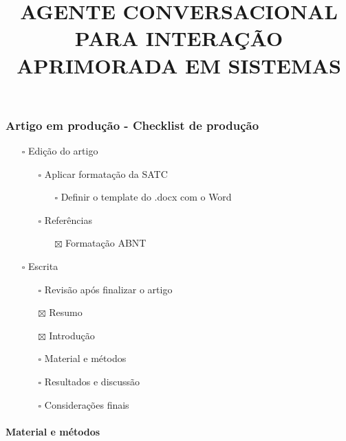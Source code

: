 \documentclass[
]{article}
\title{\textbf{AGENTE CONVERSACIONAL PARA INTERAÇÃO APRIMORADA EM
SISTEMAS}}
\author{}
\date{}
\providecommand{\tightlist}{%
  \setlength{\itemsep}{0pt}\setlength{\parskip}{0pt}}
\begin{document}
\maketitle

\subsubsection{Artigo em produção - Checklist de
produção}\label{artigo-em-produuxe7uxe3o---checklist-de-produuxe7uxe3o}

\begin{itemize}
\item[$\square$]
  Edição do artigo

  \begin{itemize}
  \tightlist
  \item[$\square$]
    Aplicar formatação da SATC

    \begin{itemize}
    \tightlist
    \item[$\square$]
      Definir o template do .docx com o Word
    \end{itemize}
  \item[$\square$]
    Referências

    \begin{itemize}
    \tightlist
    \item[$\boxtimes$]
      Formatação ABNT
    \end{itemize}
  \end{itemize}
\item[$\square$]
  Escrita

  \begin{itemize}
  \tightlist
  \item[$\square$]
    Revisão após finalizar o artigo
  \item[$\boxtimes$]
    Resumo
  \item[$\boxtimes$]
    Introdução
  \item[$\square$]
    Material e métodos
  \item[$\square$]
    Resultados e discussão
  \item[$\square$]
    Considerações finais
  \end{itemize}
\end{itemize}

\paragraph{Material e métodos}\label{material-e-muxe9todos}
\end{document}
